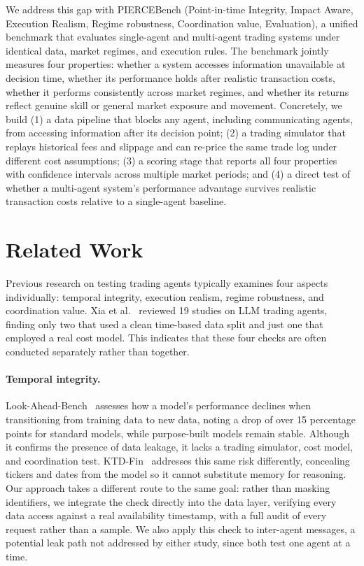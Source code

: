 \documentclass{article}
\begin{document}
We address this gap with PIERCEBench (Point-in-time Integrity, Impact Aware, Execution Realism, Regime robustness, Coordination value, Evaluation), a unified benchmark that evaluates single-agent and multi-agent trading systems under identical data, market regimes, and execution rules. The benchmark jointly measures four properties: whether a system accesses information unavailable at decision time, whether its performance holds after realistic transaction costs, whether it performs consistently across market regimes, and whether its returns reflect genuine skill or general market exposure and movement. Concretely, we build (1) a data pipeline that blocks any agent, including communicating agents, from accessing information after its decision point; (2) a trading simulator that replays historical fees and slippage and can re-price the same trade log under different cost assumptions; (3) a scoring stage that reports all four properties with confidence intervals across multiple market periods; and (4) a direct test of whether a multi-agent system's performance advantage survives realistic transaction costs relative to a single-agent baseline.

\section{Related Work}

Previous research on testing trading agents typically examines four aspects individually: temporal integrity, execution realism, regime robustness, and coordination value. Xia et al.~\cite{xia2025} reviewed 19 studies on LLM trading agents, finding only two that used a clean time-based data split and just one that employed a real cost model. This indicates that these four checks are often conducted separately rather than together.

\paragraph{Temporal integrity.} Look-Ahead-Bench~\cite{benhenda2026} assesses how a model's performance declines when transitioning from training data to new data, noting a drop of over 15 percentage points for standard models, while purpose-built models remain stable. Although it confirms the presence of data leakage, it lacks a trading simulator, cost model, and coordination test. KTD-Fin~\cite{zhu2026ktdfin} addresses this same risk differently, concealing tickers and dates from the model so it cannot substitute memory for reasoning. Our approach takes a different route to the same goal: rather than masking identifiers, we integrate the check directly into the data layer, verifying every data access against a real availability timestamp, with a full audit of every request rather than a sample. We also apply this check to inter-agent messages, a potential leak path not addressed by either study, since both test one agent at a time.
\end{document}
